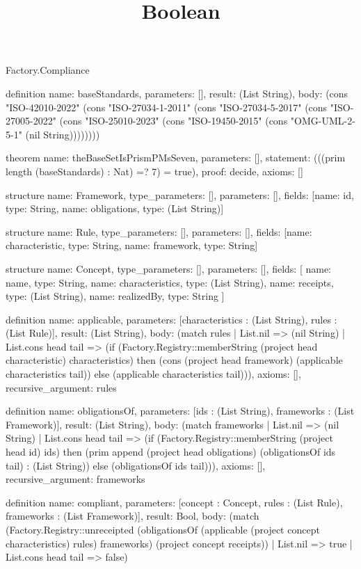 \begin{lexlean}{Factory.Compliance}
\title{Boolean}
\begin{semanticmodule}
definition{
  name: baseStandards,
  parameters: [],
  result: (List String),
  body: (cons "ISO-42010-2022" (cons "ISO-27034-1-2011" (cons "ISO-27034-5-2017" (cons "ISO-27005-2022" (cons "ISO-25010-2023" (cons "ISO-19450-2015" (cons "OMG-UML-2-5-1" (nil String))))))))
}

theorem{
  name: theBaseSetIsPrismPMsSeven,
  parameters: [],
  statement: (((prim length (baseStandards) : Nat) =? 7) = true),
  proof: decide{},
  axioms: []
}

structure{
  name: Framework,
  type_parameters: [],
  parameters: [],
  fields: [{name: id, type: String}, {name: obligations, type: (List String)}]
}

structure{
  name: Rule,
  type_parameters: [],
  parameters: [],
  fields: [{name: characteristic, type: String}, {name: framework, type: String}]
}

structure{
  name: Concept,
  type_parameters: [],
  parameters: [],
  fields: [
    {name: name, type: String},
    {name: characteristics, type: (List String)},
    {name: receipts, type: (List String)},
    {name: realizedBy, type: String}
  ]
}

definition{
  name: applicable,
  parameters: [characteristics : (List String), rules : (List Rule)],
  result: (List String),
  body: (match rules
    | List.nil => (nil String)
    | List.cons head tail => (if (Factory.Registry::memberString (project head characteristic) characteristics) then (cons (project head framework) (applicable characteristics tail)) else (applicable characteristics tail))),
  axioms: [],
  recursive_argument: rules
}

definition{
  name: obligationsOf,
  parameters: [ids : (List String), frameworks : (List Framework)],
  result: (List String),
  body: (match frameworks
    | List.nil => (nil String)
    | List.cons head tail => (if (Factory.Registry::memberString (project head id) ids) then (prim append (project head obligations) (obligationsOf ids tail) : (List String)) else (obligationsOf ids tail))),
  axioms: [],
  recursive_argument: frameworks
}

definition{
  name: compliant,
  parameters: [concept : Concept, rules : (List Rule), frameworks : (List Framework)],
  result: Bool,
  body: (match (Factory.Registry::unreceipted (obligationsOf (applicable (project concept characteristics) rules) frameworks) (project concept receipts))
    | List.nil => true
    | List.cons head tail => false)
}


\end{semanticmodule}
\end{lexlean}
